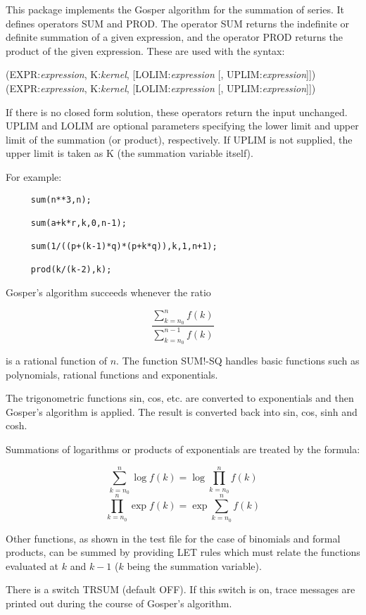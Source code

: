 
  
This package implements the Gosper algorithm for the summation of series.
It defines operators SUM and PROD.  The operator SUM returns the indefinite
or definite summation of a given expression, and the operator PROD returns
the product of the given expression.  These are used with the syntax:

\vspace{.1in}
(EXPR:{\em expression}, K:{\em kernel},
[LOLIM:{\em expression} [, UPLIM:{\em expression}]])
\vspace{.1in}
(EXPR:{\em expression}, K:{\em kernel},
[LOLIM:{\em expression} [, UPLIM:{\em expression}]])

If there is no closed form solution, these operators return the input
unchanged.  UPLIM and LOLIM are optional parameters specifying the lower
limit and upper limit of the summation (or product), respectively.  If UPLIM
is not supplied, the upper limit is taken as K (the summation variable
itself).

For example:

\begin{verbatim}
     sum(n**3,n);

     sum(a+k*r,k,0,n-1);

     sum(1/((p+(k-1)*q)*(p+k*q)),k,1,n+1);

     prod(k/(k-2),k);
\end{verbatim}

Gosper's algorithm succeeds whenever the ratio

\[ \frac{\sum_{k=n_0}^n f(k)}{\sum_{k=n_0}^{n-1} f(k)} \]

\noindent is a rational function of $n$.  The function SUM!-SQ
handles basic functions such as polynomials, rational functions and
exponentials. 

The trigonometric functions sin, cos, etc. are converted to exponentials
and then Gosper's algorithm is applied.  The result is converted back into
sin, cos, sinh and cosh.

Summations of logarithms or products of exponentials are treated by the
formula:

\vspace{.1in}
\hspace*{2em} \[ \sum_{k=n_0}^{n} \log f(k) = \log \prod_{k=n_0}^n f(k) \]
\vspace{.1in}
\hspace*{2em} \[ \prod_{k=n_0}^n \exp f(k) = \exp \sum_{k=n_0}^n f(k) \]
\vspace{.1in}

Other functions, as shown in the test file for the case of binomials and
formal products, can be summed by providing LET rules which must relate the
functions evaluated at $k$ and $k - 1$ ($k$ being the summation variable).

 
There is a switch TRSUM (default OFF).  If this switch is on, trace
messages are printed out during the course of Gosper's algorithm.

